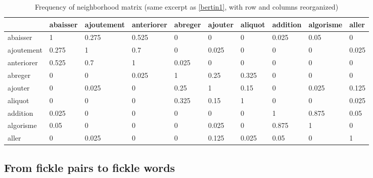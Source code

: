 \documentclass[preprint]{elsarticle}
\begin{document}
\begin{table}
\begin{small}

\begin{tabular}{|l|l|l|l|l|l|l|l|l|l|}
\hline
 & abaisser & ajoutement & anteriorer& abreger & ajouter & aliquot & addition & algorisme & aller \\ \hline
abaisser  & \cellcolor{gris} 1 & \cellcolor{gris} 0.275 & \cellcolor{gris} 0.525 & 0 & 0 & 0 & \cellcolor{grisclair} 0.025 & \cellcolor{grisclair} 0.05 & 0 \\ \hline
ajoutement  & \cellcolor{gris} 0.275 & \cellcolor{gris} 1 & \cellcolor{gris} 0.7 & 0 & \cellcolor{grisclair} 0.025 & 0 & 0 & 0 & \cellcolor{grisclair} 0.025 \\ \hline
anteriorer & \cellcolor{gris} 0.525 & \cellcolor{gris} 0.7 & \cellcolor{gris} 1 & \cellcolor{grisclair} 0.025 & 0 & 0 & 0 & 0 & 0 \\ \hline
abreger & 0 & 0 &\cellcolor{grisclair} 0.025& \cellcolor{gris} 1 & \cellcolor{gris} 0.25 & \cellcolor{gris} 0.325 & 0 & 0 & 0 \\ \hline
ajouter & 0 & \cellcolor{grisclair} 0.025 & 0& \cellcolor{gris} 0.25 & \cellcolor{gris} 1 & \cellcolor{grisclair} 0.15 & 0 & \cellcolor{grisclair} 0.025 & \cellcolor{grisclair} 0.125 \\ \hline
aliquot & 0 & 0 & 0& \cellcolor{gris} 0.325 & \cellcolor{grisclair} 0.15 & \cellcolor{gris} 1 & 0 & 0 & \cellcolor{grisclair} 0.025 \\ \hline
addition & \cellcolor{grisclair} 0.025 & 0 & 0& 0 & 0 & 0 & \cellcolor{gris} 1 & \cellcolor{gris} 0.875 & \cellcolor{grisclair} 0.05 \\ \hline
algorisme & \cellcolor{grisclair} 0.05 & 0 & 0& 0 & \cellcolor{grisclair} 0.025 & 0 & \cellcolor{gris} 0.875 & \cellcolor{gris} 1 & 0 \\ \hline
aller & 0 & \cellcolor{grisclair} 0.025 & 0& 0 & \cellcolor{grisclair} 0.125 & \cellcolor{grisclair} 0.025 & \cellcolor{grisclair} 0.05 & 0 & \cellcolor{gris} 1 \\ \hline
\end{tabular}
\end{small}
\caption{Frequency of neighborhood matrix (same excerpt as \ref{bertin1}, with row and columns reorganized)}
\label{bertin2}
\end{table}

\subsection{From fickle pairs to fickle words}
\label{fromfrom}
\end{document}
